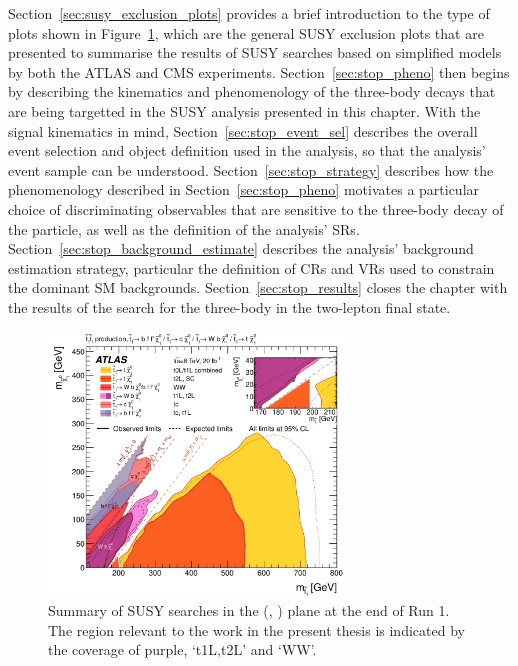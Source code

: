 Section~\ref{sec:susy_exclusion_plots} provides a brief introduction to the type of plots
shown in Figure~\ref{fig:run1_stop_summary}, which are the general SUSY exclusion plots
that are presented to summarise the results of SUSY searches based on simplified models
by both the ATLAS and CMS experiments.
Section~\ref{sec:stop_pheno} then begins by describing the kinematics and phenomenology of the three-body \stopone
decays that are being targetted in the SUSY analysis presented in this chapter.
With the signal kinematics in mind, Section~\ref{sec:stop_event_sel} describes the overall event
selection and object definition used in the analysis, so that the analysis' event sample can be understood.
Section~\ref{sec:stop_strategy} describes how the phenomenology described in Section~\ref{sec:stop_pheno}
motivates a particular choice of discriminating observables that are sensitive to the three-body decay
of the \stopone particle, as well as the definition of the analysis' SRs.
Section~\ref{sec:stop_background_estimate} describes the analysis' background estimation
strategy, particular the definition of CRs and VRs used to constrain the dominant
SM backgrounds.
Section~\ref{sec:stop_results} closes the chapter with the results of the search for
the three-body \stopone in the two-lepton final state.


\begin{figure}[!htb]
    \begin{center}
        \includegraphics[width=0.7\textwidth]{figures/search_stop2l/run1_stop_summary}
        \caption{
            Summary of SUSY \stopone searches in the (\stopone, \ninoone) plane
            at the end of Run 1.
            The region relevant to the work in the present thesis is indicated by the 
            coverage of purple, `t1L,t2L' and `WW'.
        }
        \label{fig:run1_stop_summary}
    \end{center}
\end{figure}

